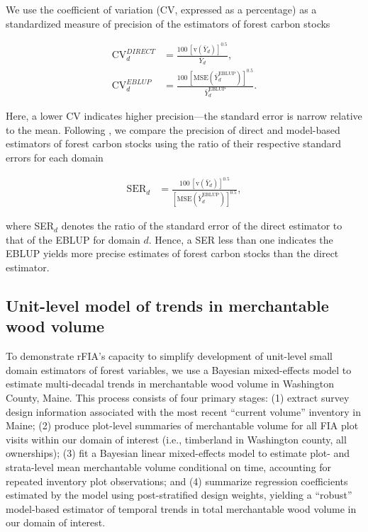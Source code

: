 \documentclass[11pt]{article}
\begin{document}
We use the coefficient of variation (CV, expressed as a percentage) as a standardized measure of precision of the estimators of forest carbon stocks
\begin{linenomath*}
\begin{align}
   \mathrm{CV}_{d}^{DIRECT} &= \frac{100 \, [\mathrm{v}( \bar{Y}_{d} )]^{0.5}}{\bar{Y}_{d}}, \\
   \mathrm{CV}_{d}^{EBLUP} &= \frac{100 \,[\mathrm{MSE}(\bar{Y}_{d}^{\mathrm{EBLUP}})]^{0.5}}{\bar{Y}_{d}^{\mathrm{EBLUP}}}.
\end{align}
\end{linenomath*}
Here, a lower CV indicates higher precision---the standard error is narrow relative to the mean. Following \citet{coulston2021enhancing}, we compare the precision of direct and model-based estimators of forest carbon stocks using the ratio of their respective standard errors for each domain
\begin{linenomath*}
\begin{align}
   \mathrm{SER}_{d} &= \frac{100 \, [\mathrm{v}( \bar{Y}_{d} )]^{0.5}}{[\mathrm{MSE}(\bar{Y}_{d}^{\mathrm{EBLUP}})]^{0.5}},
\end{align}
\end{linenomath*}
where SER$_{d}$ denotes the ratio of the standard error of the direct estimator to that of the EBLUP for domain $d$. Hence, a SER less than one indicates the EBLUP yields more precise estimates of forest carbon stocks than the direct estimator. 

\subsection*{Unit-level model of trends in merchantable wood volume}
To demonstrate rFIA's capacity to simplify development of unit-level small domain estimators of forest variables, we use a Bayesian mixed-effects model to estimate multi-decadal trends in merchantable wood volume in Washington County, Maine. This process consists of four primary stages: (1) extract survey design information associated with the most recent ``current volume'' inventory in Maine; (2) produce plot-level summaries of merchantable volume for all FIA plot visits within our domain of interest (i.e., timberland in Washington county, all ownerships); (3) fit a Bayesian linear mixed-effects model to estimate plot- and strata-level mean merchantable volume conditional on time, accounting for repeated inventory plot observations; and (4) summarize regression coefficients estimated by the model using post-stratified design weights, yielding a ``robust'' model-based estimator of temporal trends in total merchantable wood volume in our domain of interest.
\end{document}
